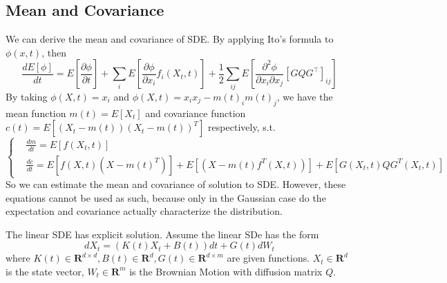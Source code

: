 \subsection{Mean and Covariance}
We can derive the mean and covariance of SDE.
By applying Ito's formula to $\phi(x, t)$, then
\begin{equation}
    \frac{d E[\phi]}{d t}=E\left[\frac{\partial \phi}{\partial t}\right]+\sum_{i} E\left[\frac{\partial \phi}{\partial x_{i}} f_{i}(X_t, t)\right]+\frac{1}{2} \sum_{i j} E\left[\frac{\partial^{2} \phi}{\partial x_{i} \partial x_{j}}\left[G Q G^{\top}\right]_{i j}\right]
\end{equation}
By taking $\phi(X, t)=x_i$ and $\phi(X, t)=x_ix_j-m(t)_im(t)_j$, we have the mean function $m(t)=E[X_t]$ 
and covariance function $c(t)=E\left[\left(X_t-m(t)\right)\left(X_t-m(t)\right)^T\right]$ respectively, s.t.
\begin{equation}\label{SDEMC}
    \left\{
        \begin{aligned}
            &\frac{d m}{d t}=E\left[f(X_t, t)\right]\\
            &\frac{d c}{d t}=E\left[f(X, t)(X-m(t)^T)\right]+E\left[(X-m(t)f^T(X, t))\right]+E\left[G(X_t, t)QG^T(X_t, t)\right]
        \end{aligned}
    \right.
\end{equation}
So we can estimate the mean and covariance of solution to SDE. However, these equations cannot be used as such, 
because only in the Gaussian case do the expectation and covariance actually characterize the distribution. 

The linear SDE has explicit solution. Assume the linear SDe has the form 
\begin{equation}
    dX_t =\left(K(t)X_t + B(t)\right)dt + G(t)dW_t
\end{equation}
where $K(t)\in \mathbf{R}^{d\times d}, B(t)\in \mathbf{R}^{d}, G(t)\in \mathbf{R}^{d\times m}$ are given functions. 
$X_t \in \mathbf{R}^d$ is the state vector, $W_t \in \mathbf{R}^m$ is the Brownian Motion with diffusion matrix $Q$.

